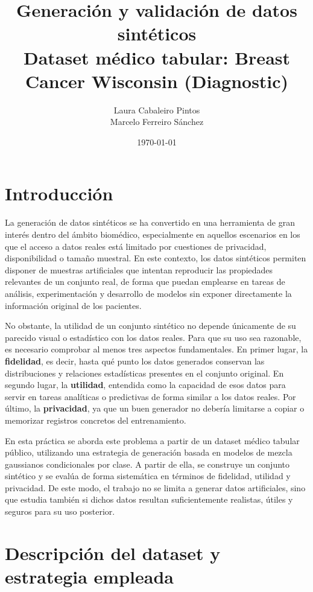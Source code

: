 \documentclass[11pt,a4paper]{article}
\title{\textbf{Generación y validación de datos sintéticos}\\
\large Dataset médico tabular: Breast Cancer Wisconsin (Diagnostic)}
\author{Laura Cabaleiro Pintos \\ Marcelo Ferreiro Sánchez}
\date{\today}
\begin{document}
\maketitle
\thispagestyle{empty}

\section{Introducción}

La generación de datos sintéticos se ha convertido en una herramienta de gran interés dentro del ámbito biomédico, especialmente en aquellos escenarios en los que el acceso a datos reales está limitado por cuestiones de privacidad, disponibilidad o tamaño muestral. En este contexto, los datos sintéticos permiten disponer de muestras artificiales que intentan reproducir las propiedades relevantes de un conjunto real, de forma que puedan emplearse en tareas de análisis, experimentación y desarrollo de modelos sin exponer directamente la información original de los pacientes.

No obstante, la utilidad de un conjunto sintético no depende únicamente de su parecido visual o estadístico con los datos reales. Para que su uso sea razonable, es necesario comprobar al menos tres aspectos fundamentales. En primer lugar, la \textbf{fidelidad}, es decir, hasta qué punto los datos generados conservan las distribuciones y relaciones estadísticas presentes en el conjunto original. En segundo lugar, la \textbf{utilidad}, entendida como la capacidad de esos datos para servir en tareas analíticas o predictivas de forma similar a los datos reales. Por último, la \textbf{privacidad}, ya que un buen generador no debería limitarse a copiar o memorizar registros concretos del entrenamiento.

En esta práctica se aborda este problema a partir de un dataset médico tabular público, utilizando una estrategia de generación basada en modelos de mezcla gaussianos condicionales por clase. A partir de ella, se construye un conjunto sintético y se evalúa de forma sistemática en términos de fidelidad, utilidad y privacidad. De este modo, el trabajo no se limita a generar datos artificiales, sino que estudia también si dichos datos resultan suficientemente realistas, útiles y seguros para su uso posterior.

\section{Descripción del dataset y estrategia empleada}
\end{document}
